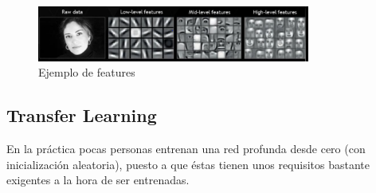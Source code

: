 \documentclass[12,twoside]{TFG-GM}
\theoremstyle{definition}
\theoremstyle{remark}
\begin{document}
\begin{figure}[h]
\centering
\includegraphics[width = 0.8\textwidth]{Images/deepConcept.png} 
\caption{Ejemplo de features \label{fig:deepconcept}}
\end{figure}

\subsection{Transfer Learning}

En la práctica pocas personas entrenan una red profunda desde cero (con inicialización aleatoria), puesto a que éstas tienen unos requisitos bastante exigentes a la hora de ser entrenadas. 
\end{document}
